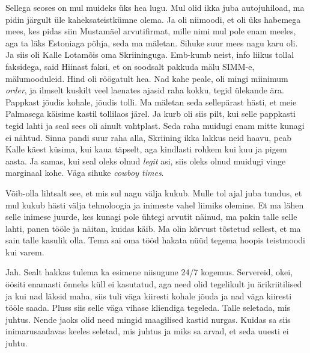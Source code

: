 
Sellega seoses on mul muideks üks hea lugu. Mul olid ikka juba autojuhiload, ma 
pidin järgult üle kaheksateistkümne olema. Ja oli niimoodi, et oli üks habemega 
mees, kes pidas siin Mustamäel arvutifirmat, mille nimi mul pole enam meeles, 
aga ta läks Estoniaga põhja, seda ma mäletan. Sihuke suur mees nagu karu oli. 
Ja siis oli Kalle Lotamõis oma Skriininguga. Emb-kumb neist, 
info liikus tollal faksidega, said Hiinast faksi, et on soodsalt pakkuda mälu 
SIMM-e, mälumooduleid. Hind oli röögatult hea. Nad kahe peale, oli mingi 
miinimum \emph{order},  ja ilmselt kuskilt veel  laenates ajasid raha kokku, 
tegid  ülekande ära. Pappkast jõudis kohale, jõudis tolli. Ma mäletan seda 
sellepärast hästi, et meie Palmasega käisime kastil tollilaos järel. Ja kurb 
oli siis pilt, kui selle pappkasti tegid lahti ja seal sees oli ainult 
vahtplast. Seda raha muidugi enam mitte kunagi ei nähtud. Sinna pandi suur raha 
alla, Skriining ikka lakkus neid haavu, peab Kalle käest küsima, kui kaua 
täpselt, aga kindlasti rohkem kui kuu ja pigem aasta. Ja samas, kui seal oleks 
olnud \emph{legit} asi, siis  oleks olnud muidugi vinge marginaal kohe. Väga 
sihuke \emph{cowboy times}. 


Võib-olla lihtsalt see, et mis sul nagu välja kukub. Mulle tol ajal juba 
tundus, et mul kukub hästi välja tehnoloogia ja inimeste vahel  liimiks 
olemine. Et ma lähen selle inimese juurde, kes kunagi pole ühtegi arvutit 
näinud, ma pakin talle selle lahti, panen tööle ja näitan, kuidas käib. Ma 
olin kõrvust tõstetud sellest, et ma sain talle kasulik olla. Tema sai oma tööd 
hakata nüüd tegema hoopis teistmoodi kui varem. 


Jah. Sealt hakkas tulema ka  esimene niisugune 24/7 kogemus. Servereid, okei, 
öösiti enamasti õnneks küll ei kasutatud, aga need olid tegelikult ju 
ärikriitilised ja kui nad läksid maha, siis tuli väga kiiresti kohale jõuda ja 
nad väga kiiresti tööle saada. Pluss siis selle väga vihase kliendiga tegeleda. 
Talle seletada, mis juhtus. Nende jaoks olid need mingid maagilised kastid 
nurgas. Kuidas sa siis inimarusaadavas keeles seletad, mis juhtus ja miks sa 
arvad, et seda uuesti ei juhtu.

